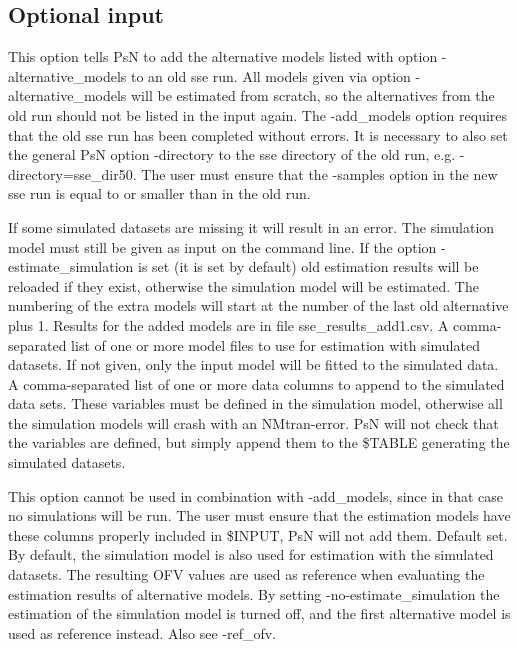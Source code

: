 \subsection{Optional input}
\begin{optionlist}
This option tells PsN to add the alternative models listed with option -alternative\_models to an old sse run. All models given via option -alternative\_models will be estimated from scratch, so the alternatives from the old run should not be listed in the input again. The -add\_models option requires that the old sse run has been completed without errors. It is necessary to also set the general PsN option -directory to the sse directory of the old run, e.g. -directory=sse\_dir50. The user must ensure that the -samples option in the new sse run is equal to or smaller than in the old run. 

If some simulated datasets are missing it will result in an error. The simulation model must still be given as input on the command line. If the option -estimate\_simulation is set (it is set by default) old estimation results will be reloaded if they exist, otherwise the simulation model will be estimated. The numbering of the extra models will start at the number of the last old alternative plus 1. Results for the added models are in file sse\_results\_add1.csv.
\nextopt	
{}
A comma-separated list of one or more model files to use for estimation with simulated datasets. If not given, only the input model will be fitted to the simulated data. 
\nextopt
{}
A comma-separated list of one or more data columns to append to the simulated data sets. These variables must be defined in the simulation model, otherwise all the simulation models will crash with an NMtran-error. PsN will not check that the variables are defined, but simply append them to the \$TABLE generating the simulated datasets. 

This option cannot be used in combination with -add\_models, since in that case no simulations will be run. The user must ensure that the estimation models have these columns properly included in \$INPUT, PsN will not add them.  
\nextopt
{}
Default set. By default, the simulation model is also used for estimation with the simulated datasets. The resulting OFV values are used as reference when evaluating the estimation results of alternative models. By setting -no-estimate\_simulation the estimation of the simulation model is turned off, and the first alternative model is used as reference instead. Also see -ref\_ofv.


\end{optionlist}
